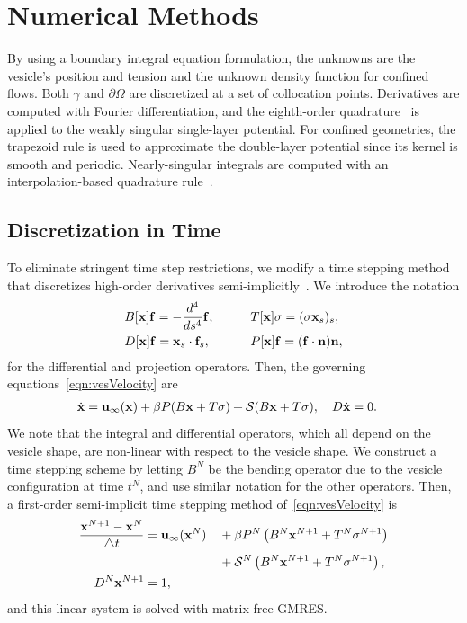 \documentclass[prb,preprint,showpacs,preprintnumbers,amsmath,amssymb,longbibliography]{revtex4-1}
\begin{document}
\section{Numerical Methods}
By using a boundary integral equation formulation, the unknowns are the
vesicle's position and tension and the unknown density function for
confined flows. Both $\gamma$ and $\partial\Omega$ are discretized at a
set of collocation points. Derivatives are computed with Fourier
differentiation, and the eighth-order quadrature~\cite{alp1999} is
applied to the weakly singular single-layer potential. For confined
geometries, the trapezoid rule is used to approximate the double-layer
potential since its kernel is smooth and periodic. Nearly-singular
integrals are computed with an interpolation-based quadrature
rule~\cite{qua-bir2014}.

\subsection{Discretization in Time}
To eliminate stringent time step restrictions, we modify a time stepping
method that discretizes high-order derivatives
semi-implicitly~\cite{vee-gue-zor-bir2009}. We introduce the notation
\begin{alignat}{3}
  &B[\mathbf{x}]\mathbf{f} = -\frac{d^4}{ds^4} \mathbf{f},  \qquad
  &&T[\mathbf{x}]\sigma = (\sigma \mathbf{x}_s)_s, \\
  &D[\mathbf{x}]\mathbf{f} = \mathbf{x}_s \cdot \mathbf{f}_s, 
  &&P[\mathbf{x}]\mathbf{f} = (\mathbf{f} \cdot \mathbf{n}) \mathbf{n},
\end{alignat}
for the differential and projection operators. Then, the
governing equations~\eqref{eqn:vesVelocity} are
\begin{align}
  \dot{\mathbf{x}} &= \mathbf{u}_\infty(\mathbf{x}) + \beta P(B\mathbf{x} + T\sigma)
  + \mathcal{S} (B\mathbf{x} + T\sigma), \quad
  D \dot{\mathbf{x}} = 0.
\end{align}
We note that the integral and differential operators, which all depend
on the vesicle shape, are non-linear with respect to the vesicle
shape. We construct a time stepping scheme by letting $B^N$ be the
bending operator due to the vesicle configuration at time $t^N$, and use
similar notation for the other operators. Then, a first-order
semi-implicit time stepping method of~\eqref{eqn:vesVelocity} is
\begin{alignat}{3}  
  \frac{\mathbf{x}^{N+1} - \mathbf{x}^N}{\triangle t} &= \mathbf{u}_\infty(\mathbf{x}^N) 
  &&+ \beta P^N\left(B^N\mathbf{x}^{N+1} + T^N\sigma^{N+1}\right) \nonumber \\
  & &&+ \mathcal{S}^N\left(B^N\mathbf{x}^{N+1} + T^N\sigma^{N+1}\right),  \\
  D^N\mathbf{x}^{N+1} &= 1,
\end{alignat}
and this linear system is solved with matrix-free GMRES.
\end{document}
